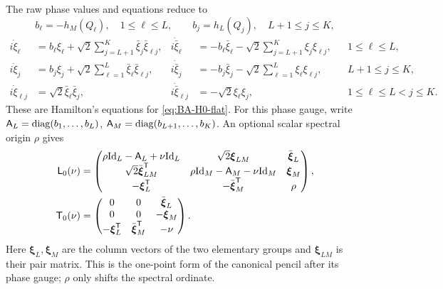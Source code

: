The raw phase values and equations reduce to
\begin{equation}\label{eq:one-point-phase-values}
 b_{\ell}=-h_M(Q_{\ell}),\quad1\leq\ell\leq L,\qquad
 b_j=h_L(Q_j),\quad L+1\leq j\leq K,
\end{equation}
\begin{equation}\label{eq:general-network-rates}
\begin{aligned}
 i\dot\xi_{\ell}&=b_{\ell}\xi_{\ell}+\sqrt2\sum_{j=L+1}^{K}\bar{\xi}_j\bar{\xi}_{\ell j},&
 i\dot{\bar{\xi}}_{\ell}&=-b_{\ell}\bar{\xi}_{\ell}-\sqrt2\sum_{j=L+1}^{K}\xi_j\xi_{\ell j},
 &&1\leq\ell\leq L,\\
 i\dot\xi_j&=b_j\xi_j+\sqrt2\sum_{\ell=1}^{L}\bar{\xi}_{\ell}\bar{\xi}_{\ell j},&
 i\dot{\bar{\xi}}_j&=-b_j\bar{\xi}_j-\sqrt2\sum_{\ell=1}^{L}\xi_{\ell}\xi_{\ell j},
 &&L+1\leq j\leq K,\\
 i\dot\xi_{\ell j}&=\sqrt2\bar{\xi}_{\ell}\bar{\xi}_j,&
 i\dot{\bar{\xi}}_{\ell j}&=-\sqrt2\xi_{\ell}\xi_j,
 &&1\leq\ell\leq L<j\leq K.
\end{aligned}
\end{equation}
These are Hamilton's equations for \cref{eq:BA-H0-flat}.
For this phase gauge, write $\mathsf A_L=\operatorname{diag}(b_1,\ldots,b_L)$,
$\mathsf A_M=\operatorname{diag}(b_{L+1},\ldots,b_K)$.
An optional scalar spectral origin $\rho$ gives
\begin{equation}\label{eq:BA-H0-pencil}
\begin{aligned}
 \mathsf L_0(\nu)&=\begin{pmatrix}
 \rho\mathrm{Id}_L-\mathsf A_L+\nu\mathrm{Id}_L&\sqrt2\boldsymbol\xi_{LM}&\bar{\boldsymbol\xi}_L\\
 \sqrt2\bar{\boldsymbol\xi}_{LM}^{\mathsf T}&\rho\mathrm{Id}_M-\mathsf A_M-\nu\mathrm{Id}_M&\boldsymbol\xi_M\\
 -\boldsymbol\xi_L^{\mathsf T}&-\bar{\boldsymbol\xi}_M^{\mathsf T}&\rho
 \end{pmatrix},\\
 \mathsf T_0(\nu)&=\begin{pmatrix}
 0&0&\bar{\boldsymbol\xi}_L\\0&0&-\boldsymbol\xi_M\\
 -\boldsymbol\xi_L^{\mathsf T}&\bar{\boldsymbol\xi}_M^{\mathsf T}&-\nu
 \end{pmatrix}.
\end{aligned}
\end{equation}
Here $\boldsymbol\xi_L,\boldsymbol\xi_M$ are the column vectors of
the two elementary groups and $\boldsymbol\xi_{LM}$ is their pair
matrix. This is the one-point form of the canonical pencil after
its phase gauge; $\rho$ only shifts the spectral ordinate.

